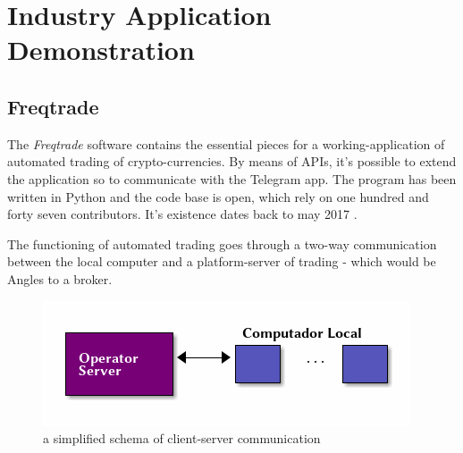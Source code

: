 \documentclass[
12pt,				%
openright,			%
oneside,			%
a4paper,			%
brazil,				%
english,			%
]{abntex2}
\begin{document}
\section{Industry Application Demonstration}
\subsection{Freqtrade}
The \emph{Freqtrade} software contains the essential pieces for a
working-application of automated trading of crypto-currencies. By
means of APIs, it's possible to extend the application so to
communicate with the Telegram app. The program has been written in
Python and the code base is open, which rely on one hundred and
forty seven contributors. It's existence dates back to may 2017 \cite{fang2020cryptocurrency}.



The functioning of automated trading goes through a two-way
communication between the local computer and a platform-server of
trading - which would be Angles to a broker.

\begin{figure}[ht]
  \centering
    \caption{\label{fig:diagrama-freqtrade} a simplified schema of
      client-server communication}
  \includegraphics[width=0.6\linewidth]{Imagens/server-client-fq_4.png}
\end{figure}
\end{document}
